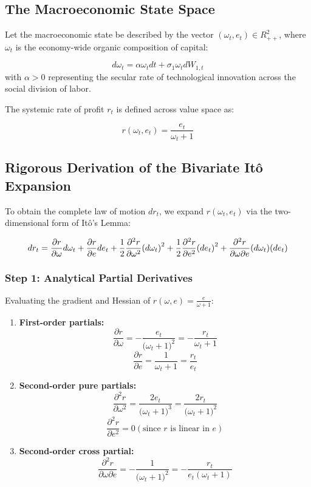 \documentclass[11pt,letterpaper]{report}
\newcommand{\fitmath}[1]{\begingroup\setbox0=\hbox{$\displaystyle #1$}\ifdim\wd0>\linewidth\resizebox{\linewidth}{!}{$\displaystyle #1$}\else\displaystyle #1\fi\endgroup}
\begin{document}
\subsection{The Macroeconomic State Space}
Let the macroeconomic state be described by the vector $({\omega }_{t},{e}_{t})\in {R}_{++}^{2}$, where ${\omega }_{t}$ is the economy-wide organic composition of capital:

\[
d{\omega }_{t}=\alpha {\omega }_{t}dt+{\sigma }_{1}{\omega }_{t}d{W}_{1,t}
\]
with $\alpha >0$ representing the secular rate of technological innovation across the social division of labor.

The systemic rate of profit ${r}_{t}$ is defined across value space as:

\[
r({\omega }_{t},{e}_{t})=\frac{{e}_{t}}{{\omega }_{t}+1}
\]
\subsection{Rigorous Derivation of the Bivariate Itô Expansion}
To obtain the complete law of motion $d{r}_{t}$, we expand $r({\omega }_{t},{e}_{t})$ via the two-dimensional form of Itô's Lemma:

\[\fitmath{d{r}_{t}=\frac{\partial r}{\partial \omega }d{\omega }_{t}+\frac{\partial r}{\partial e}d{e}_{t}+\frac{1}{2}\frac{{\partial }^{2}r}{\partial {\omega }^{2}}(d{\omega }_{t}{)}^{2}+\frac{1}{2}\frac{{\partial }^{2}r}{\partial {e}^{2}}(d{e}_{t}{)}^{2}+\frac{{\partial }^{2}r}{\partial \omega \partial e}(d{\omega }_{t})(d{e}_{t})}\]
\subsubsection{Step 1: Analytical Partial Derivatives}
Evaluating the gradient and Hessian of $r(\omega ,e)=\frac{e}{\omega +1}$:

\begin{enumerate}
\item \textbf{First-order partials:}
\[
\frac{\partial r}{\partial \omega }=-\frac{{e}_{t}}{({\omega }_{t}+1{)}^{2}}=-\frac{{r}_{t}}{{\omega }_{t}+1}
\]
\[
\frac{\partial r}{\partial e}=\frac{1}{{\omega }_{t}+1}=\frac{{r}_{t}}{{e}_{t}}
\]
\item \textbf{Second-order pure partials:}
\[
\frac{{\partial }^{2}r}{\partial {\omega }^{2}}=\frac{2{e}_{t}}{({\omega }_{t}+1{)}^{3}}=\frac{2{r}_{t}}{({\omega }_{t}+1{)}^{2}}
\]
\[
\frac{{\partial }^{2}r}{\partial {e}^{2}}=0(\text{since }r\text{ is linear in }e)
\]
\item \textbf{Second-order cross partial:}
\[
\frac{{\partial }^{2}r}{\partial \omega \partial e}=-\frac{1}{({\omega }_{t}+1{)}^{2}}=-\frac{{r}_{t}}{{e}_{t}({\omega }_{t}+1)}
\]
\end{enumerate}
\end{document}
